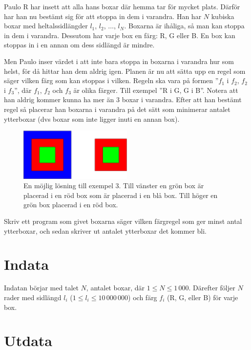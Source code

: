 Paulo R har insett att alla hans boxar där hemma tar för mycket plats. Därför har han nu
bestämt sig för att stoppa in dem i varandra. Han har $N$ kubiska boxar med
heltalssidlängder $l_1$, $l_2$, $\ldots$, $l_N$. Boxarna är ihåliga, så man kan stoppa in
dem i varandra. Dessutom har varje box en färg: R, G eller B. 
En box kan stoppas in i en annan om dess sidlängd är mindre.

Men Paulo inser värdet i att inte bara stoppa in boxarna i varandra hur som helst,
för då hittar han dem aldrig igen.
Planen är nu att sätta upp en regel som säger vilken färg som kan stoppas i
vilken. Regeln ska vara på formen ''$f_1$ i $f_2$, $f_2$ i $f_3$'', 
där $f_1$, $f_2$ och $f_3$ är olika färger. Till exempel ''R i
G, G i B''. Notera att han aldrig kommer kunna ha mer än 3 boxar i
varandra. Efter att han bestämt regel så placerar han boxarna i varandra på det sätt
som minimerar antalet ytterboxar (dvs boxar som inte ligger inuti en annan box).

\begin{figure}[h!]
  \centering
  \includegraphics[width=0.5\textwidth]{sample3}
  \caption{En möjlig lösning till exempel 3.
  Till vänster en grön box är placerad i en röd box som är placerad i en blå box.
  Till höger en grön box placerad i en röd box.}
  \label{fig:sample3}
\end{figure}

Skriv ett program som givet boxarna säger vilken färgregel som ger minst antal
ytterboxar, och sedan skriver ut antalet ytterboxar det kommer bli.

\section*{Indata}

Indatan börjar med talet $N$, antalet boxar, där $1\le N \le 1\,000$. Därefter följer $N$ rader med sidlängd
$l_i$ ($1 \le l_i \le 10\,000\,000$) och färg $f_i$ (R, G, eller B) för varje box.

\section*{Utdata}

